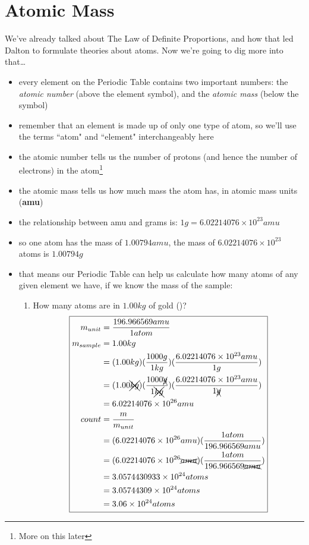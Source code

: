 \documentclass[11pt, oneside]{article}   	%
\begin{document}
\section{Atomic Mass}

We've already talked about The Law of Definite Proportions, and how that led Dalton to formulate theories about atoms. Now we're going to dig more into that\ldots

\begin{itemize}
\item every element on the Periodic Table contains two important numbers: the \emph{atomic number} (above the element symbol), and the \emph{atomic mass} (below the symbol)
\item remember that an element is made up of only one type of atom, so we'll use the terms ``atom" and ``element" interchangeably here
\item the atomic number tells us the number of protons (and hence the number of electrons) in the atom\footnote{More on this later}
\item the atomic mass tells us how much mass the atom has, in atomic mass units (\textbf{amu})
\item the relationship between amu and grams is: $ 1 g = 6.02214076 \times 10^{23} amu$
\item so one  atom has the mass of $ 1.00794 amu$, the mass of $ 6.02214076 \times 10^{23} $  atoms is $ 1.00794 g$
\item that means our Periodic Table can help us calculate how many atoms of any given element we have, if we know the mass of the sample:
\begin{enumerate}[label=Example \arabic*]
\item How many atoms are in $1.00 kg$ of gold ()? 
\begin{equation} 
\boxed{
\begin{split}
    m_{unit} &= \frac{196.966569 amu}{1 atom} \\
    m_{sample} &= 1.00 kg \\
                        &= ( 1.00 kg ) (\frac{1000 g}{1 kg}) ( \frac{6.02214076 \times 10^{23} amu}{1 g}) \\
                        &= ( 1.00 \xcancel{kg} ) (\frac{1000 \xcancel{g}}{1 \xcancel{kg}}) ( \frac{6.02214076 \times 10^{23} amu}{1 \xcancel{g}}) \\
                        &= 6.02214076 \times 10^{26} amu \\
   count &= \frac{m}{m_{unit}} \\
             &=  (6.02214076 \times 10^{26} amu) (\frac{1 atom}{196.966569 amu}) \\
             &=  (6.02214076 \times 10^{26} \xcancel{amu}) (\frac{1 atom}{196.966569 \xcancel{amu}}) \\
             &=  3.0574430933 \times 10^{24} atoms \\
             &=  3.05744309 \times 10^{24} atoms \\ 
             &=  3.06 \times 10^{24} atoms \\                    
 \end{split}
 }
 \end{equation}
 

\end{enumerate}
\end{itemize}
\end{document}
